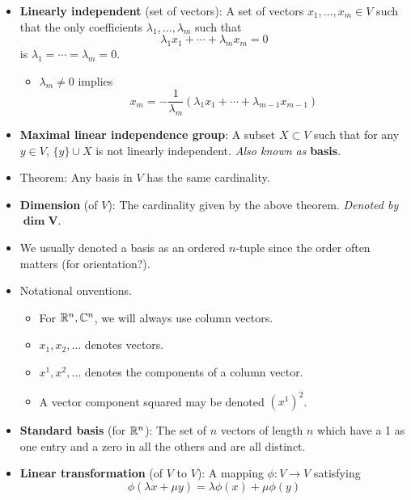 \documentclass[../notes.tex]{subfiles}
\begin{document}
\begin{itemize}
\begin{itemize}
    \end{itemize}
    \item \textbf{Linearly independent} (set of vectors): A set of vectors $x_1,\dots,x_m\in V$ such that the only coefficients $\lambda_1,\dots,\lambda_m$ such that
    \begin{equation*}
        \lambda_1x_1+\cdots+\lambda_mx_m = 0
    \end{equation*}
    is $\lambda_1=\cdots=\lambda_m=0$.
    \begin{itemize}
        \item $\lambda_m\neq 0$ implies
        \begin{equation*}
            x_m = -\frac{1}{\lambda_m}(\lambda_1x_1+\cdots+\lambda_{m-1}x_{m-1})
        \end{equation*}
    \end{itemize}
    \item \textbf{Maximal linear independence group}: A subset $X\subset V$ such that for any $y\in V$, $\{y\}\cup X$ is not linearly independent. \emph{Also known as} \textbf{basis}.
    \item Theorem: Any basis in $V$ has the same cardinality.
    \item \textbf{Dimension} (of $V$): The cardinality given by the above theorem. \emph{Denoted by} $\bm{\dim V}$.
    \item We usually denoted a basis as an ordered $n$-tuple since the order often matters (for orientation?).
    \item Notational onventions.
    \begin{itemize}
        \item For $\mathbb{R}^n,\mathbb{C}^n$, we will always use column vectors.
        \item $x_1,x_2,\dots$ denotes vectors.
        \item $x^1,x^2,\dots$ denotes the components of a column vector.
        \item A vector component squared may be denoted $(x^1)^2$.
    \end{itemize}
    \item \textbf{Standard basis} (for $\mathbb{R}^n$): The set of $n$ vectors of length $n$ which have a 1 as one entry and a zero in all the others and are all distinct.
    \item \textbf{Linear transformation} (of $V$ to $V$): A mapping $\phi:V\to V$ satisfying
    \begin{equation*}
        \phi(\lambda x+\mu y) = \lambda\phi(x)+\mu\phi(y)
    \end{equation*}

\end{itemize}
\end{document}
